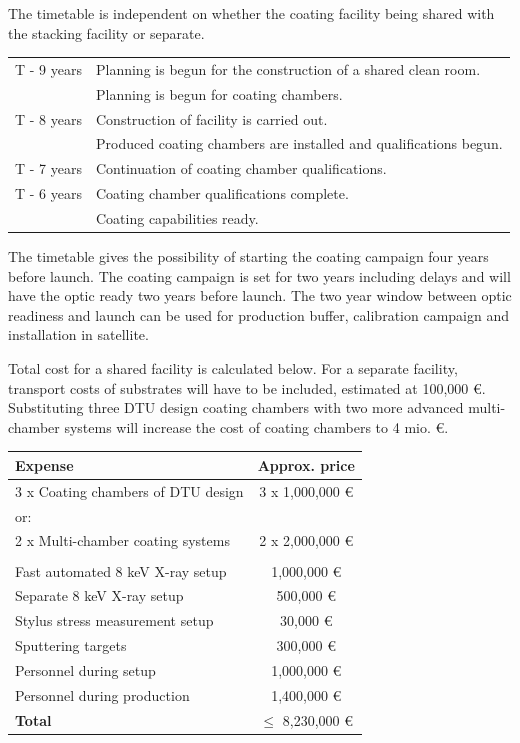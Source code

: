 The timetable is independent on whether the coating facility being shared with the stacking facility or separate.\\

\begin{table}[htbp]
	\centering
\begin{tabular}{c|l}
T - 9 years & Planning is begun for the construction of a shared clean room. \\
			& Planning is begun for coating chambers.\\
\hline
T - 8 years & Construction of facility is carried out.\\
			& Produced coating chambers are installed and qualifications begun.\\
\hline
T - 7 years & Continuation of coating chamber qualifications.\\
\hline
T - 6 years & Coating chamber qualifications complete.\\
			& Coating capabilities ready.\\

\end{tabular}
\end{table}

The timetable gives the possibility of starting the coating campaign four years before launch. The coating campaign is set for two years including delays and will have the optic ready two years before launch. The two year window between optic readiness and launch can be used for production buffer, calibration campaign and installation in satellite.

Total cost for a shared facility is calculated below. For a separate facility, transport costs of substrates will have to be included, estimated at 100,000 \euro. Substituting three DTU design coating chambers with two more advanced multi-chamber systems will increase the cost of coating chambers to 4 mio. \euro.

\begin{table}[htbp]
	\centering
\begin{tabular}{l|c}
Expense & Approx. price\\
\hline
\hline
3 x Coating chambers of DTU design  & 3 x 1,000,000 \euro\\
\hline
or:\\
\hline
2 x Multi-chamber coating systems & 2 x 2,000,000 \euro \\
\hline
\\
\hline
Fast automated 8 keV X-ray setup  & 1,000,000 \euro\\
\hline
Separate 8 keV X-ray setup & 500,000 \euro\\
\hline
Stylus stress measurement setup & 30,000 \euro\\
\hline
Sputtering targets & 300,000 \euro\\
\hline
Personnel during setup & 1,000,000 \euro\\
\hline
Personnel during production & 1,400,000 \euro\\
\hline
\textbf{Total} & $\leq$ 8,230,000 \euro\\
\end{tabular}
\end{table}
